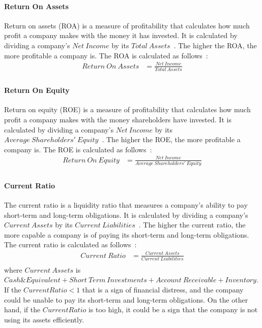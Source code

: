 \documentclass[../xlapes02]{subfiles}
\begin{document}
    \paragraph{Return On Assets}\label{par:return-on-assets}
    Return on assets (ROA) is a measure of profitability that calculates how much profit a company makes with the money it has invested. It is calculated by dividing a company's $Net\ Income$ by its $Total\ Assets$~\cite{investopedia, investopedia}. The higher the ROA, the more profitable a company is. The ROA is calculated as follows~\cite{investopedia}:
    \begin{equation}
        \begin{split}
            Return\ On\ Assets&=\frac{Net\ Income}{Total\ Assets}\\
        \end{split}
    \end{equation}

    \paragraph{Return On Equity}\label{par:return-on-equity}
    Return on equity (ROE) is a measure of profitability that calculates how much profit a company makes with the money shareholders have invested. It is calculated by dividing a company's $Net\ Income$ by its $Average\ Shareholders'\ Equity$~\cite{investopedia}. The higher the ROE, the more profitable a company is. The ROE is calculated as follows~\cite{investopedia}:
    \begin{equation}
        \begin{split}
            Return\ On\ Equity&=\frac{Net\ Income}{Average\ Shareholders'\ Equity}\\
        \end{split}
    \end{equation}

    \paragraph{Current Ratio}\label{par:current-ratio}
    The current ratio is a liquidity ratio that measures a company's ability to pay short-term and long-term obligations. It is calculated by dividing a company's $Current\ Assets$ by its $Current\ Liabilities$~\cite{investopedia, investopedia}. The higher the current ratio, the more capable a company is of paying its short-term and long-term obligations. The current ratio is calculated as follows~\cite{investopedia}:
    \begin{equation}
        \begin{split}
            Current\ Ratio&=\frac{Current\ Assets}{Current\ Liabilities}\\
        \end{split}
    \end{equation}
    where $Current\ Assets$ is $Cash\&Equivalent+Short\ Term\ Investments+Account\ Receivable+Inventory$. If the $Current Ratio < 1$ that is a sign of financial distress, and the company could be unable to pay its short-term and long-term obligations. On the other hand, if the $Current Ratio$ is too high, it could be a sign that the company is not using its assets efficiently.
\end{document}
